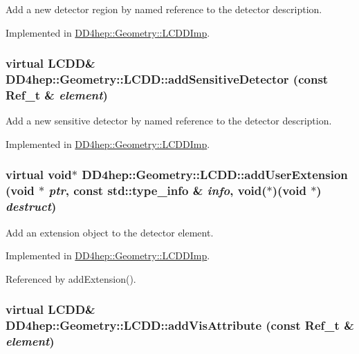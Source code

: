 Add a new detector region by named reference to the detector description. 

Implemented in \hyperlink{class_d_d4hep_1_1_geometry_1_1_l_c_d_d_imp_a9b24c9ac8dde50f36fbeea3e6cb8d2cb}{DD4hep::Geometry::LCDDImp}.\hypertarget{class_d_d4hep_1_1_geometry_1_1_l_c_d_d_aa574186ef096f626835ea6f389769230}{
\subsubsection[{addSensitiveDetector}]{\setlength{\rightskip}{0pt plus 5cm}virtual {\bf LCDD}\& DD4hep::Geometry::LCDD::addSensitiveDetector (const {\bf Ref\_\-t} \& {\em element})}}
\label{class_d_d4hep_1_1_geometry_1_1_l_c_d_d_aa574186ef096f626835ea6f389769230}


Add a new sensitive detector by named reference to the detector description. 

Implemented in \hyperlink{class_d_d4hep_1_1_geometry_1_1_l_c_d_d_imp_a5509dc3840aa73a8c5d5e8f886f3be3f}{DD4hep::Geometry::LCDDImp}.\hypertarget{class_d_d4hep_1_1_geometry_1_1_l_c_d_d_ae4fdea118902519ae7581fe0bd733559}{
\subsubsection[{addUserExtension}]{\setlength{\rightskip}{0pt plus 5cm}virtual void$\ast$ DD4hep::Geometry::LCDD::addUserExtension (void $\ast$ {\em ptr}, \/  const std::type\_\-info \& {\em info}, \/  void($\ast$)(void $\ast$) {\em destruct})}}
\label{class_d_d4hep_1_1_geometry_1_1_l_c_d_d_ae4fdea118902519ae7581fe0bd733559}


Add an extension object to the detector element. 

Implemented in \hyperlink{class_d_d4hep_1_1_geometry_1_1_l_c_d_d_imp_a6a8e772cd986a1e6211b4e3b0b1ae997}{DD4hep::Geometry::LCDDImp}.

Referenced by addExtension().\hypertarget{class_d_d4hep_1_1_geometry_1_1_l_c_d_d_a705cc171273fe3aa63100385b1bd7191}{
\subsubsection[{addVisAttribute}]{\setlength{\rightskip}{0pt plus 5cm}virtual {\bf LCDD}\& DD4hep::Geometry::LCDD::addVisAttribute (const {\bf Ref\_\-t} \& {\em element})}}
\label{class_d_d4hep_1_1_geometry_1_1_l_c_d_d_a705cc171273fe3aa63100385b1bd7191}


